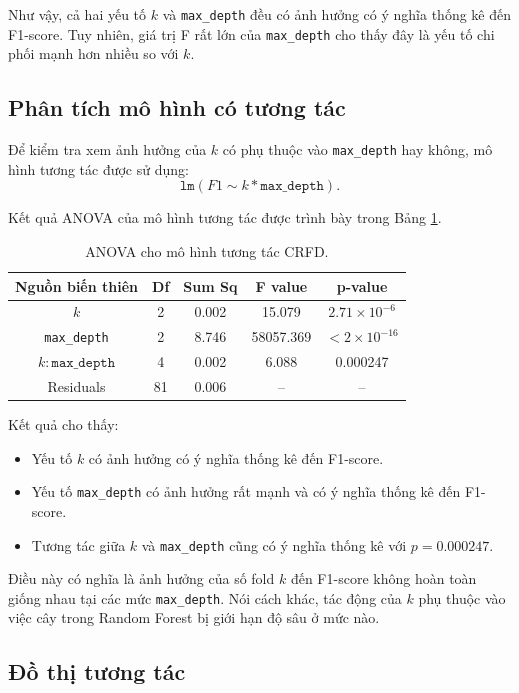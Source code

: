 \documentclass[12pt,a4paper]{article}
\begin{document}
Như vậy, cả hai yếu tố $k$ và \texttt{max\_depth} đều có ảnh hưởng có ý nghĩa thống kê đến F1-score. Tuy nhiên, giá trị F rất lớn của \texttt{max\_depth} cho thấy đây là yếu tố chi phối mạnh hơn nhiều so với $k$.

\subsection{Phân tích mô hình có tương tác}

Để kiểm tra xem ảnh hưởng của $k$ có phụ thuộc vào \texttt{max\_depth} hay không, mô hình tương tác được sử dụng:
\[
\texttt{lm}(F1 \sim k * \texttt{max\_depth}).
\]

Kết quả ANOVA của mô hình tương tác được trình bày trong Bảng \ref{tab:crfd_anova}.

\begin{table}[H]
    \centering
    \caption{ANOVA cho mô hình tương tác CRFD.}
    \label{tab:crfd_anova}
    \begin{tabular}{ccccc}
        \toprule
        Nguồn biến thiên & Df & Sum Sq & F value & p-value \\
        \midrule
        $k$ & 2 & 0.002 & 15.079 & $2.71 \times 10^{-6}$ \\
        \texttt{max\_depth} & 2 & 8.746 & 58057.369 & $< 2 \times 10^{-16}$ \\
        $k:\texttt{max\_depth}$ & 4 & 0.002 & 6.088 & 0.000247 \\
        Residuals & 81 & 0.006 & -- & -- \\
        \bottomrule
    \end{tabular}
\end{table}

Kết quả cho thấy:
\begin{itemize}
    \item Yếu tố $k$ có ảnh hưởng có ý nghĩa thống kê đến F1-score.
    \item Yếu tố \texttt{max\_depth} có ảnh hưởng rất mạnh và có ý nghĩa thống kê đến F1-score.
    \item Tương tác giữa $k$ và \texttt{max\_depth} cũng có ý nghĩa thống kê với $p = 0.000247$.
\end{itemize}

Điều này có nghĩa là ảnh hưởng của số fold $k$ đến F1-score không hoàn toàn giống nhau tại các mức \texttt{max\_depth}. Nói cách khác, tác động của $k$ phụ thuộc vào việc cây trong Random Forest bị giới hạn độ sâu ở mức nào.

\subsection{Đồ thị tương tác}
\end{document}
